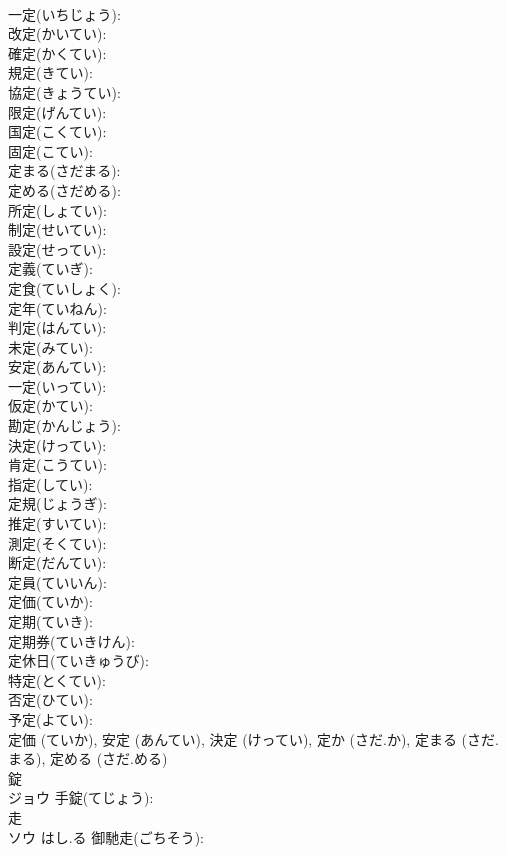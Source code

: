 \documentclass[8pt]{extreport}
\begin{document}
\begin{CJK}{UTF8}{min}
\\	一定(いちじょう): 
\\	改定(かいてい): 
\\	確定(かくてい): 
\\	規定(きてい): 
\\	協定(きょうてい): 
\\	限定(げんてい): 
\\	国定(こくてい): 
\\	固定(こてい): 
\\	定まる(さだまる): 
\\	定める(さだめる): 
\\	所定(しょてい): 
\\	制定(せいてい): 
\\	設定(せってい): 
\\	定義(ていぎ): 
\\	定食(ていしょく): 
\\	定年(ていねん): 
\\	判定(はんてい): 
\\	未定(みてい): 
\\	安定(あんてい): 
\\	一定(いってい): 
\\	仮定(かてい): 
\\	勘定(かんじょう): 
\\	決定(けってい): 
\\	肯定(こうてい): 
\\	指定(してい): 
\\	定規(じょうぎ): 
\\	推定(すいてい): 
\\	測定(そくてい): 
\\	断定(だんてい): 
\\	定員(ていいん): 
\\	定価(ていか): 
\\	定期(ていき): 
\\	定期券(ていきけん): 
\\	定休日(ていきゅうび): 
\\	特定(とくてい): 
\\	否定(ひてい): 
\\	予定(よてい): 
\\	定価 (ていか), 安定 (あんてい), 決定 (けってい), 定か (さだ.か), 定まる (さだ.まる), 定める (さだ.める)
\\	錠			
\\	ジョウ		手錠(てじょう): 
\\	走			
\\	ソウ	はし.る	御馳走(ごちそう): 

\end{CJK}
\end{document}
